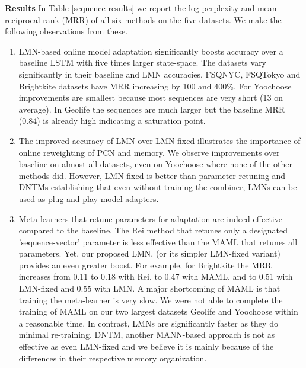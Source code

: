 \documentclass[letterpaper]{article} %
\begin{document}
\begin{table}[!htb]
\begin{center}
\begin{tabular}{|l|r|r|r|r|r|r|r|} \hline

\end{tabular}
\end{center}
\end{table}
{ \bf Results}
In Table \ref{sequence-results} we report the log-perplexity and mean reciprocal rank (MRR) of all six methods on the five datasets. We make the following observations from these.
\begin{enumerate}
\item LMN-based online model adaptation significantly boosts accuracy over a baseline LSTM with five times larger state-space.
The datasets vary significantly in their baseline and LMN accuracies. FSQNYC, FSQTokyo and Brightkite datasets have MRR increasing by 100 and 400\%.  For Yoochoose improvements are smallest because most sequences are very short (13 on average). In Geolife the sequences are much larger but the baseline MRR (0.84) is already high indicating a saturation point.
\item The improved accuracy of LMN over LMN-fixed illustrates the importance of online reweighting of PCN and memory. We observe improvements over baseline on almost all datasets, even on Yoochoose where none of the other methods did.  However, LMN-fixed is better than parameter retuning and DNTMs establishing that even without training the combiner, LMNs can be used as plug-and-play model adapters.
\item Meta learners that retune parameters for adaptation are indeed effective compared to the baseline.  The Rei method that retunes only a designated 'sequence-vector' parameter is less effective than the MAML that retunes all parameters. Yet, our proposed LMN, (or its simpler LMN-fixed variant) provides an even greater boost.  For example, for Brightkite the MRR increases from 0.11 to 0.18 with Rei, to 0.47 with MAML, and to 0.51 with LMN-fixed and 0.55 with LMN.
A major shortcoming of MAML is that training the meta-learner is very slow.  We were not able to complete the training of MAML on our two largest datasets Geolife and Yoochoose within a reasonable time. In contrast, LMNs are significantly faster as they do minimal re-training.
DNTM, another MANN-based approach is not as effective as even LMN-fixed and we believe it is mainly because of the differences in their respective memory organization.
\end{enumerate}
\end{document}
